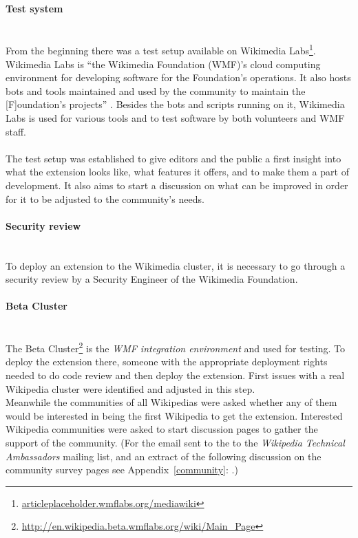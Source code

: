 \paragraph{Test system} ~\\
From the beginning there was a test setup available on Wikimedia Labs\footnote{\url{articleplaceholder.wmflabs.org/mediawiki}}. Wikimedia Labs is ``the Wikimedia Foundation (WMF)'s cloud computing environment for developing software for the Foundation's operations. It also hosts bots and tools maintained and used by the community to maintain the [F]oundation's projects'' \citep{wiki:03}.
Besides the bots and scripts running on it, Wikimedia Labs is used for various tools and to test software by both volunteers and WMF staff. \\
\\
The test setup was established to give editors and the public a first insight into what the extension looks like, what features it offers, and to make them a part of development. It also aims to start a discussion on what can be improved in order for it to be adjusted to the community's needs.

\paragraph{Security review} ~\\
To deploy an extension to the Wikimedia cluster, it is necessary to go through a security review by a Security Engineer of the Wikimedia Foundation. 
  
\paragraph{Beta Cluster} ~\\
The Beta Cluster\footnote{\url{http://en.wikipedia.beta.wmflabs.org/wiki/Main_Page}} is the \textit{WMF integration environment} and used for testing. To deploy the extension there, someone with the appropriate deployment rights needed to do code review and then deploy the extension. First issues with a real Wikipedia cluster were identified and adjusted in this step. \\
Meanwhile the communities of all Wikipedias were asked whether any of them would be interested in being the first Wikipedia to get the extension. Interested Wikipedia communities were asked to start discussion pages to gather the support of the community. (For the email sent to the to the \textit{Wikipedia Technical Ambassadors} mailing list, and an extract of the following discussion on the community survey pages see Appendix~\ref{community}: .)

